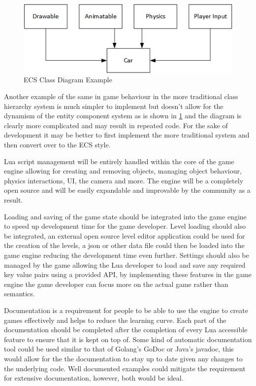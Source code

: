 \documentclass[11pt,a4paper,titlepage]{report}
\begin{document}
	\begin{figure}[h]
		\centering
		\includegraphics[scale=0.75]{ECS2}
		\caption{ECS Class Diagram Example}
		\label{fig:ClassDiagram2}
	\end{figure}

	Another example of the same in game behaviour in the more traditional class hierarchy system is much simpler to implement but doesn't allow for the dynamism of the entity component system as is shown in \ref{fig:ClassDiagram2} and the diagram is clearly more complicated and may result in repeated code. For the sake of development it may be better to first implement the more traditional system and then convert over to the ECS style.

	Lua script management will be entirely handled within the core of the game engine allowing for creating and removing objects, managing object behaviour, physics interactions, UI, the camera and more. The engine will be a completely open source and will be easily expandable and improvable by the community as a result.

	Loading and saving of the game state should be integrated into the game engine to speed up development time for the game developer. Level loading should also be integrated, an external open source level editor application could be used for the creation of the levels, a json or other data file could then be loaded into the game engine reducing the development time even further. Settings should also be managed by the game allowing the Lua developer to load and save any required key value pairs using a provided API, by implementing these features in the game engine the game developer can focus more on the actual game rather than semantics.

	Documentation is a requirement for people to be able to use the engine to create games effectively and helps to reduce the learning curve. Each part of the documentation should be completed after the completion of every Lua accessible feature to ensure that it is kept on top of. Some kind of automatic documentation tool could be used similar to that of Golang's GoDoc or Java's javadoc, this would allow for the the documentation to stay up to date given any changes to the underlying code. Well documented examples could mitigate the requirement for extensive documentation, however, both would be ideal.
	
\end{document}
